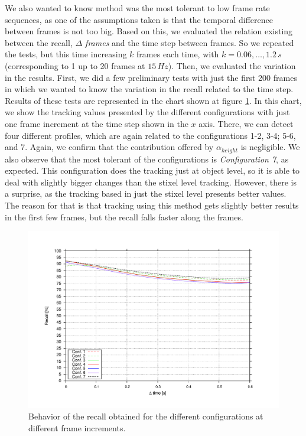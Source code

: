 We also wanted to know method was the most tolerant to low frame rate sequences, as one of the assumptions taken is that the temporal difference between frames is not too big. Based on this, we evaluated the relation existing between the recall, \emph{$\Delta$ frames} and the time step between frames. So we repeated the tests, but this time increasing $k$ frames each time, with $k=0.06,\dots,1.2\,s$ (corresponding to 1 up to 20 frames at $15\,Hz$). Then, we evaluated the variation in the results. First, we did a few preliminary tests with just the first 200 frames in which we wanted to know the variation in the recall related to the time step. Results of these tests are represented in the chart shown at figure \ref{fig:cp04_recall_vs_step}. In this chart, we show the tracking values presented by the different configurations with just one frame increment at the time step shown in the $x$ axis. There, we can detect four different profiles, which are again related to the configurations 1-2, 3-4; 5-6, and 7. Again, we confirm that the contribution offered by $\alpha_{height}$ is negligible. We also observe that the most tolerant of the configurations is \emph{Configuration 7}, as expected. This configuration does the tracking just at object level, so it is able to deal with slightly bigger changes than the stixel level tracking. However, there is a surprise, as the tracking based in just the stixel level presents better values. The reason for that is that tracking using this method gets slightly better results in the first few frames, but the recall falls faster along the frames.

\begin{figure}[t]
\centering
\includegraphics[width=\textwidth,height=0.5\textwidth,trim=50 40 80 60,clip]{recall_vs_step}
\caption{Behavior of the recall obtained for the different configurations at different frame increments.}\label{fig:cp04_recall_vs_step}
\end{figure}

